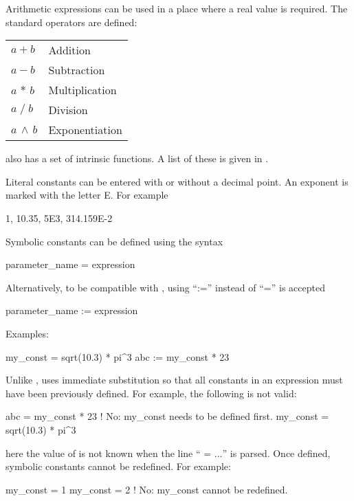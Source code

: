 {Arithmetic expressions can be used in a place where a real value is required.
The standard operators are defined: \hfil\break
\hspace*{0.15in}
\begin{tabular}{ll}
  $a + b$           & Addition        \\
  $a - b$           & Subtraction     \\
  $a \, \ast \, b$  & Multiplication  \\
  $a \; / \; b$     & Division        \\
  $a \, \land \, b$ & Exponentiation  \\
\end{tabular}
\hfil\break
\bmad also has a set of intrinsic functions. A list of these is given
in .

Literal constants can be entered with or without a decimal point. An
exponent is marked with the letter E. For example
\begin{example}
  1, 10.35, 5E3, 314.159E-2
\end{example}
Symbolic constants can be defined using the syntax
\begin{example}
  parameter_name = expression
\end{example}
Alternatively, to be compatible with \mad, using ``:='' instead of ``='' is accepted
\begin{example}
  parameter_name := expression
\end{example}
Examples:
\begin{example}
  my_const = sqrt(10.3) * pi^3
  abc     := my_const * 23
\end{example}
Unlike \mad, \bmad uses immediate substitution so that all constants
in an expression must have been previously defined. For example, the
following is not valid:
\begin{example}
  abc      = my_const * 23      ! No: my_const needs to be defined first.
  my_const = sqrt(10.3) * pi^3
\end{example}
here the value of  is not known when the line ``
= $\ldots$'' is parsed. Once
defined, symbolic constants cannot be redefined. For example:
\begin{example}
  my_const = 1
  my_const = 2  ! No: my_const cannot be redefined.
\end{example}

}
